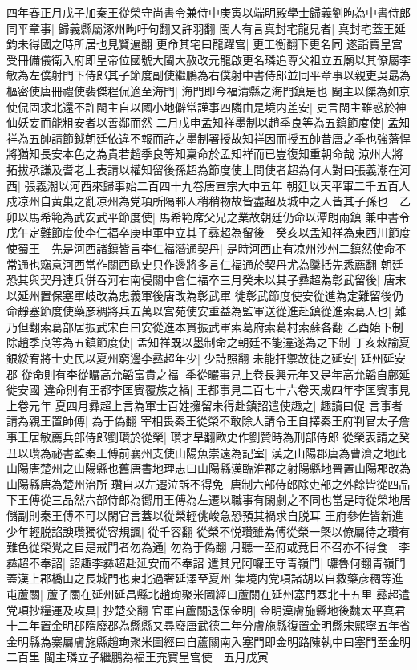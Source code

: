 四年春正月戊子加秦王從榮守尚書令兼侍中庚寅以端明殿學士歸義劉昫為中書侍郎同平章事|{
	歸義縣屬涿州昫吁句翻又許羽翻}
閩人有言真封宅龍見者|{
	真封宅蓋王延鈞未得國之時所居也見賢遍翻}
更命其宅曰龍躍宫|{
	更工衡翻下更名同}
遂詣寶皇宫受冊備儀衛入府即皇帝位國號大閩大赦改元龍啟更名璘追尊父祖立五廟以其僚屬李敏為左僕射門下侍郎其子節度副使繼鵬為右僕射中書侍郎並同平章事以親吏吳朂為樞密使唐冊禮使裴傑程侃適至海門|{
	海門即今福清縣之海門鎮是也}
閩主以傑為如京使侃固求北還不許閩主自以國小地僻常謹事四隣由是境内差安|{
	史言閩主雖惑於神仙妖妄而能粗安者以善鄰而然}
二月戊申孟知祥墨制以趙季良等為五鎮節度使|{
	孟知祥為五帥請節鉞朝廷依違不報而許之墨制署授故知祥因而授五帥昔唐之季也強藩悍將猶知長安本色之為貴若趙季良等知稟命於孟知祥而已豈復知重朝命哉}
涼州大將拓拔承謙及耆老上表請以權知留後孫超為節度使上問使者超為何人對曰張義潮在河西|{
	張義潮以河西來歸事始二百四十九卷唐宣宗大中五年}
朝廷以天平軍二千五百人戍凉州自黄巢之亂凉州為党項所隔鄆人稍稍物故皆盡超及城中之人皆其子孫也　乙卯以馬希範為武安武平節度使|{
	馬希範席父兄之業故朝廷仍命以潭朗兩鎮}
兼中書令　戊午定難節度使李仁福卒庚申軍中立其子彞超為留後　癸亥以孟知祥為東西川節度使蜀王　先是河西諸鎮皆言李仁福潛通契丹|{
	是時河西止有凉州沙州二鎮然使命不常通也竊意河西當作關西歐史只作邊將多言仁福通於契丹尤為櫽括先悉薦翻}
朝廷恐其與契丹連兵併吞河右南侵關中會仁福卒三月癸未以其子彞超為彰武留後|{
	唐末以延州置保塞軍岐改為忠義軍後唐改為彰武軍}
徙彰武節度使安從進為定難留後仍命靜塞節度使藥彦稠將兵五萬以宫苑使安重益為監軍送從進赴鎮從進索葛人也|{
	難乃但翻索葛部居振武宋白曰安從進本貫振武軍索葛府索葛村索蘇各翻}
乙酉始下制除趙季良等為五鎮節度使|{
	孟知祥既以墨制命之朝廷不能違遂為之下制}
丁亥敕諭夏銀綏宥將士吏民以夏州窮邊李彞超年少|{
	少詩照翻}
未能扞禦故徙之延安|{
	延州延安郡}
從命則有李從曮高允韜富貴之福|{
	季從曮事見上卷長興元年又是年高允韜自鄜延徙安國}
違命則有王都李匡賓覆族之禍|{
	王都事見二百七十六卷天成四年李匡賓事見上卷元年}
夏四月彞超上言為軍士百姓擁留未得赴鎮詔遣使趣之|{
	趣讀曰促}
言事者請為親王置師傅|{
	為于偽翻}
宰相畏秦王從榮不敢除人請令王自擇秦王府判官太子詹事王居敏薦兵部侍郎劉瓚於從榮|{
	瓚才旱翻歐史作劉贊時為刑部侍郎}
從榮表請之癸丑以瓚為祕書監秦王傅前襄州支使山陽魚崇遠為記室|{
	漢之山陽郡唐為曹濟之地此山陽唐楚州之山陽縣也舊唐書地理志曰山陽縣漢臨淮郡之射陽縣地晉置山陽郡改為山陽縣唐為楚州治所}
瓚自以左遷泣訴不得免|{
	唐制六部侍郎除吏部之外餘皆從四品下王傅從三品然六部侍郎為嚮用王傅為左遷以職事有閑劇之不同也當是時從榮地居儲副則秦王傅不可以閑官言蓋以從榮輕佻峻急恐預其禍求自脱耳}
王府參佐皆新進少年輕脱諂諛瓚獨從容規諷|{
	從千容翻}
從榮不悦瓚雖為傅從榮一槩以僚屬待之瓚有難色從榮覺之自是戒門者勿為通|{
	勿為于偽翻}
月聽一至府或竟日不召亦不得食　李彞超不奉詔|{
	詔趣李彞超赴延安而不奉詔}
遣其兄阿囉王守青嶺門|{
	囉魯何翻青嶺門蓋漢上郡橋山之長城門也東北過奢延澤至夏州}
集境内党項諸胡以自救藥彦稠等進屯蘆關|{
	蘆子關在延州延昌縣北趙珣聚米圖經曰蘆關在延州塞門寨北十五里}
彞超遣党項抄糧運及攻具|{
	抄楚交翻}
官軍自蘆關退保金明|{
	金明漢膚施縣地後魏太平真君十二年置金明郡隋廢郡為縣縣又尋廢唐武德二年分膚施縣復置金明縣宋熙寧五年省金明縣為寨屬膚施縣趙珣聚米圖經曰自蘆關南入塞門即金明路陳執中曰塞門至金明二百里}
閩主璘立子繼鵬為福王充寶皇宫使　五月戊寅

